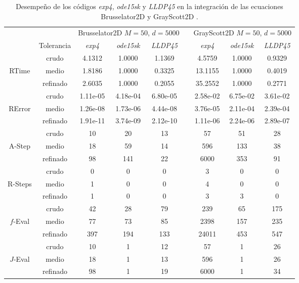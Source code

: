\begin{table}[htb]
	\caption{Desempeño de los códigos \emph{exp4}, \emph{ode15sk} y \emph{LLDP45} en la integración de las ecuaciones Brusselator2D y GrayScott2D .}	\label{tab:num-exp-lldp-var-step:bruss2dgray2d}
	\begin{adjustbox}{width=0.8\columnwidth,center}
	\begin{tabular}{  ccccccccc }
		\hline
		& & \multicolumn{3}{c}{Brusselator2D $M=50$, $d=5000$ } & & \multicolumn{3}{c}{GrayScott2D $M=50$, $d=5000$ }\\
		\cline{3-5} \cline{7-9}
		& Tolerancia & \emph{exp4} & \emph{ode15sk} & \emph{LLDP45} & & \emph{exp4} & \emph{ode15sk} & \emph{LLDP45} \\
		\hline
		& crudo & 4.1312 & 1.0000 & 1.1369 &  & 4.5759 & 1.0000 & 0.9329 \\
		RTime  & medio & 1.8186 & 1.0000 & 0.3325 &  & 13.1155 & 1.0000 & 0.4019 \\
		& refinado & 2.6035 & 1.0000 & 0.2055  & & 35.2552 & 1.0000 & 0.2771 \\
		\hline
		& crudo & 1.11e-05 & 4.18e-04 & 6.80e-05 & &  2.58e-02 & 6.75e-02 & 3.61e-02 \\
		RError  & medio & 1.26e-08 & 1.73e-06 & 4.44e-08 & &  3.76e-05 & 2.11e-04 & 2.39e-04 \\
		& refinado & 1.91e-11 & 3.74e-09 & 2.12e-10 & &  1.11e-06 & 2.24e-06 & 2.89e-07 \\
		\hline
		& crudo & 10 & 20 & 13 &  & 57 & 51 & 28 \\
		A-Step  & medio & 18 & 59 & 14 & &  596 & 133 & 38 \\
		& refinado & 98 & 141 & 22 & &  6000 & 353 & 91 \\
		\hline
		& crudo & 0 & 0 & 0  & & 3 & 0 & 0 \\
		R-Steps  & medio & 1 & 0 & 0  & & 4 & 0 & 0 \\
		& refinado & 1 & 0 & 0  & & 3 & 3 & 0 \\
		\hline
		& crudo & 42 & 28 & 79  & & 239 & 65 & 175 \\
		$f$-Eval  & medio & 77 & 73 & 85  & & 2398 & 157 & 235 \\
		& refinado & 397 & 194 & 133  & & 24011 & 453 & 547 \\
		\hline
		& crudo & 10 & 1 & 12 & &  57 & 1 & 26 \\
		$J$-Eval  & medio & 18 & 1 & 13  & & 596 & 1 & 26 \\
		& refinado & 98 & 1 & 19 & &  6000 & 1 & 34 \\

\end{tabular}
\end{adjustbox}
\end{table}
